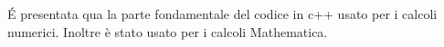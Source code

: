 \'E presentata qua la parte fondamentale del codice in c++ usato per i calcoli numerici. Inoltre è stato usato per i calcoli Mathematica.


